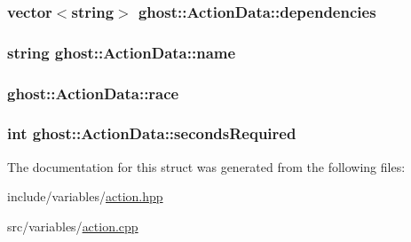 \hypertarget{structghost_1_1ActionData_a1944375640866259ba0bbc4c2a0be9be}{
\subsubsection[{dependencies}]{\setlength{\rightskip}{0pt plus 5cm}vector$<$string$>$ ghost\-::\-Action\-Data\-::dependencies}}\label{structghost_1_1ActionData_a1944375640866259ba0bbc4c2a0be9be}
\hypertarget{structghost_1_1ActionData_afadde6e57871331f04ebd051bd167285}{
\subsubsection[{name}]{\setlength{\rightskip}{0pt plus 5cm}string ghost\-::\-Action\-Data\-::name}}\label{structghost_1_1ActionData_afadde6e57871331f04ebd051bd167285}
\hypertarget{structghost_1_1ActionData_a9dc614c3bcd09ba461e5d4752c4abbc0}{
\subsubsection[{race}]{ ghost\-::\-Action\-Data\-::race}}\label{structghost_1_1ActionData_a9dc614c3bcd09ba461e5d4752c4abbc0}
\hypertarget{structghost_1_1ActionData_a7ff20dbecf38edc51e5ed22c4fb4185f}{
\subsubsection[{seconds\-Required}]{\setlength{\rightskip}{0pt plus 5cm}int ghost\-::\-Action\-Data\-::seconds\-Required}}\label{structghost_1_1ActionData_a7ff20dbecf38edc51e5ed22c4fb4185f}


The documentation for this struct was generated from the following files\-:\begin{DoxyCompactItemize}
\item 
include/variables/\hyperlink{action_8hpp}{action.\-hpp}\item 
src/variables/\hyperlink{action_8cpp}{action.\-cpp}\end{DoxyCompactItemize}
